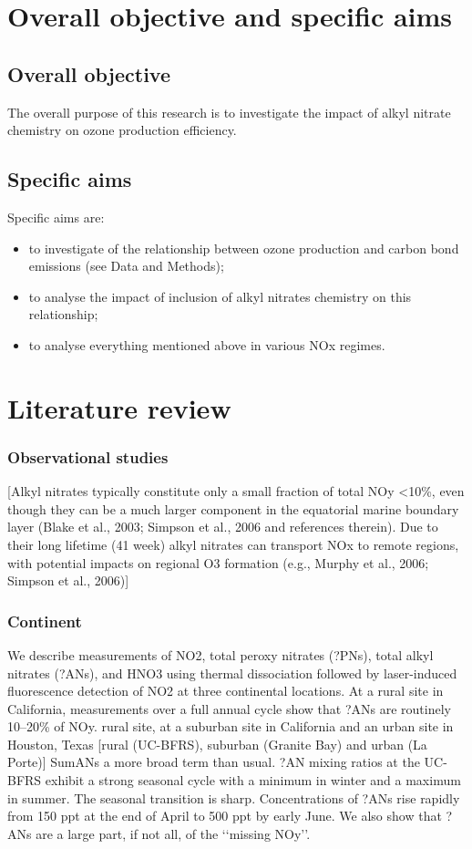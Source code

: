 \documentclass[11pt,a4paper]{article}
\begin{document}
\section{Overall objective and specific aims}
\subsection{Overall objective}
The overall purpose of this research is to investigate the impact of alkyl nitrate chemistry on ozone production efficiency.
\subsection{Specific aims}
Specific aims are:
\begin{itemize}
\item to investigate of the relationship between ozone production and carbon bond emissions (see Data and Methods);
\item to analyse the impact of inclusion of alkyl nitrates chemistry on this relationship;
\item to analyse everything mentioned above in various NOx regimes.
\end{itemize}

\section{Literature review} \label{sec:data}
\subsubsection{Observational studies}

\citep{Sommariva2008}
[Alkyl nitrates typically constitute only a small
fraction of total NOy <10\%, even though they can be a much larger component in the equatorial marine boundary layer (Blake et al., 2003; Simpson et al., 2006 and references therein). Due to their long lifetime (41 week) alkyl nitrates can transport NOx to remote regions, with potential impacts on regional O3 formation (e.g., Murphy et al., 2006; Simpson et al., 2006)]

\subsubsection*{Continent}
\citep{Day2003}
We describe measurements of NO2, total peroxy nitrates (?PNs), total alkyl nitrates (?ANs), and HNO3 using thermal dissociation followed by laser-induced fluorescence detection of NO2 at three continental locations. At a rural site in California, measurements over a full annual cycle show that ?ANs are routinely 10–20\% of NOy. rural site, at a suburban site in California and an urban site in Houston, Texas [rural (UC-BFRS), suburban (Granite Bay) and urban (La Porte)]
SumANs a more broad term than usual.
?AN mixing ratios at the UC-BFRS exhibit a strong seasonal cycle with a minimum in winter and a maximum in summer. The seasonal transition is sharp. Concentrations of ?ANs rise rapidly from 150 ppt at the end of April to 500 ppt by early June.
We also show that ?ANs are a large part, if not all, of the ‘‘missing NOy’’.
\end{document}
